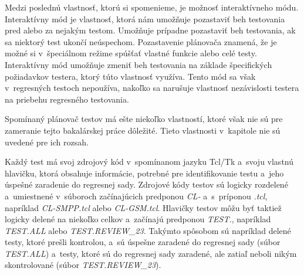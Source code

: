 Medzi poslednú vlastnosť, ktorú si spomenieme, je možnosť interaktívneho módu.
Interaktívny mód je vlastnosť, ktorá nám umožňuje pozastaviť beh 
testovania pred alebo za nejakým testom.
Umožňuje prípadne pozastaviť beh testovania, ak sa niektorý test 
ukončí neúspechom. Pozastavenie plánovača znamená, že je možné si 
v~špeciálnom režime spúšťať vlastné funkcie alebo celé testy.
Interaktívny mód umožňuje zmeniť beh testovania na základe špecifických 
požiadavkov testera, ktorý túto vlastnosť využíva.
Tento mód sa však v~regresných testoch nepoužíva, nakoľko sa narušuje 
vlastnosť nezávislosti testera na priebehu regresného testovania.

Spomínaný plánovač testov má ešte niekoľko vlastností, ktoré však nie sú
pre zameranie tejto bakalárskej práce dôležité. Tieto vlastnosti
v~kapitole nie sú uvedené pre ich rozsah. 

Každý test má svoj zdrojový kód v~spomínanom jazyku Tcl/Tk a~svoju 
vlastnú hlavičku, ktorá obsahuje informácie, potrebné pre identifikovanie 
testu a~jeho úspešné zaradenie do regresnej sady.
Zdrojové kódy testov sú logicky rozdelené a~umiestnené v~súboroch 
začínajúcich predponou \emph{CL-} a~s~príponou \emph{.tcl}, 
napríklad \emph{CL-SMPP.tcl} alebo \emph{CL-GSM.tcl}.
Hlavičky testov môžu byť taktiež logicky delené na niekoľko celkov 
a~začínajú predponou \emph{TEST.}, napríklad \emph{TEST.ALL} alebo 
\emph{TEST.REVIEW\_23}.
Takýmto spôsobom sú napríklad delené testy, ktoré prešli kontrolou,
a~sú úspešne zaradené do regresnej sady (súbor \emph{TEST.ALL}) a~testy, 
ktoré sú do regresnej sady zaradené, ale zatiaľ neboli nikým 
skontrolované (súbor \emph{TEST.REVIEW\_23}).

